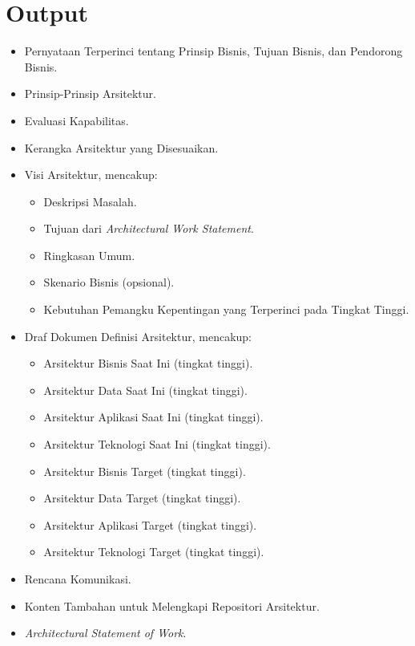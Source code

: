 \section{Output}
\begin{itemize}
	\item Pernyataan Terperinci tentang Prinsip Bisnis, Tujuan Bisnis, dan Pendorong Bisnis.
	\item Prinsip-Prinsip Arsitektur.
	\item Evaluasi Kapabilitas.
	\item Kerangka Arsitektur yang Disesuaikan.
	\item Visi Arsitektur, mencakup:
	\begin{itemize}
		\item Deskripsi Masalah.
		\item Tujuan dari \textit{Architectural Work Statement}.
		\item Ringkasan Umum.
		\item Skenario Bisnis (opsional).
		\item Kebutuhan Pemangku Kepentingan yang Terperinci pada Tingkat Tinggi.
	\end{itemize}
	\item Draf Dokumen Definisi Arsitektur, mencakup:
	\begin{itemize}
		\item Arsitektur Bisnis Saat Ini (tingkat tinggi).
		\item Arsitektur Data Saat Ini (tingkat tinggi).
		\item Arsitektur Aplikasi Saat Ini (tingkat tinggi).
		\item Arsitektur Teknologi Saat Ini (tingkat tinggi).
		\item Arsitektur Bisnis Target (tingkat tinggi).
		\item Arsitektur Data Target (tingkat tinggi).
		\item Arsitektur Aplikasi Target (tingkat tinggi).
		\item Arsitektur Teknologi Target (tingkat tinggi).
	\end{itemize}
	\item Rencana Komunikasi.
	\item Konten Tambahan untuk Melengkapi Repositori Arsitektur.
	\item \textit{Architectural Statement of Work}.
\end{itemize}

